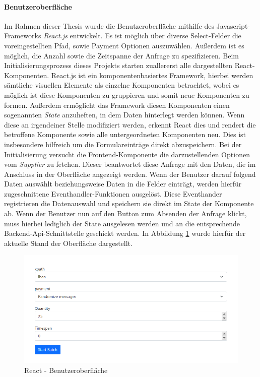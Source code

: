 \paragraph{Benutzeroberfläche}
Im Rahmen dieser Thesis wurde die Benutzeroberfläche mithilfe des Javascript-Frameworks \emph{React.js} entwickelt. Es ist möglich über diverse Select-Felder die voreingestellten Pfad, sowie Payment Optionen auszuwählen. Außerdem ist es möglich, die Anzahl sowie die Zeitspanne der Anfrage zu spezifizieren. Beim Initialisierungsprozess dieses Projekts starten zuallererst alle dargestellten React-Komponenten. React.js ist ein komponentenbasiertes Framework, hierbei werden sämtliche visuellen Elemente als einzelne Komponenten betrachtet, wobei es möglich ist diese Komponenten zu gruppieren und somit neue Komponenten zu formen. Außerdem ermöglicht das Framework diesen Komponenten einen sogenannten \emph{State} anzuheften, in dem Daten hinterlegt werden können. Wenn diese an irgendeiner Stelle modifiziert werden, erkennt React dies und rendert die betroffene Komponente sowie alle untergeordneten Komponenten neu. Dies ist insbesondere hilfreich um die Formulareinträge direkt abzuspeichern. Bei der Initialisierung versucht die Frontend-Komponente die darzustellenden Optionen vom \emph{Supplier} zu fetchen. Dieser beantwortet diese Anfrage mit den Daten, die im Anschluss in der Oberfläche angezeigt werden. Wenn der Benutzer darauf folgend Daten auswählt beziehungsweise Daten in die Felder einträgt, werden hierfür zugeschnittene Eventhandler-Funktionen ausgelöst. Diese Eventhander registrieren die Datenauswahl und speichern sie direkt im State der Komponente ab. Wenn der Benutzer nun auf den Button zum Absenden der Anfrage klickt, muss hierbei lediglich der State ausgelesen werden und an die entsprechende Backend-Api-Schnittstelle geschickt werden. In Abbildung \ref{fig:reactUi} wurde hierfür der aktuelle Stand der Oberfläche dargestellt.

\begin{figure}[ht!]
	\centering
	\includegraphics[width=.9\linewidth]{kapitel/problemloesung/implementierung/_img/react01}
	\caption[React - Benutzeroberfläche]{React - Benutzeroberfläche}
	\label{fig:reactUi}
\end{figure}

